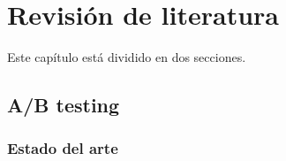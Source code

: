 \chapter{Revisión de literatura}

\noindent Este capítulo está dividido en dos secciones.  

\newpage

\section{A/B testing}

\subsection{Estado del arte}




